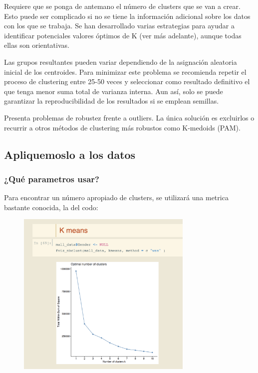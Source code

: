 \documentclass[12pt, fleqn]{report}                             %
\theoremstyle{break}                                            %
\begin{document}
            Requiere que se ponga de antemano el número de clusters que se van a crear. Esto puede ser 
            complicado si no se tiene la información adicional sobre los datos con los que se trabaja. 
            Se han desarrollado varias estrategias para ayudar a identificar potenciales valores óptimos de K 
            (ver más adelante), aunque todas ellas son orientativas.

            Las grupos resultantes pueden variar dependiendo de la asignación aleatoria inicial de los 
            centroides. Para minimizar este problema se recomienda repetir el proceso de clustering entre 25-50 
            veces y seleccionar como resultado definitivo el que tenga menor suma total de varianza interna. 
            Aun así, solo se puede garantizar la reproducibilidad de los resultados si se emplean semillas.

            Presenta problemas de robustez frente a outliers. La única solución es excluirlos o recurrir a 
            otros métodos de clustering más robustos como K-medoids (PAM).


        \clearpage
        \subsection{Apliquemoslo a los datos}

        \subsubsection{¿Qué parametros usar?}


            Para encontrar un número apropiado de clusters, se utilizará una metrica bastante conocida, la del codo:
            \begin{figure}[ht!]
                \centering
                \includegraphics[width=0.75\textwidth]{k1}
            \end{figure}
\end{document}
